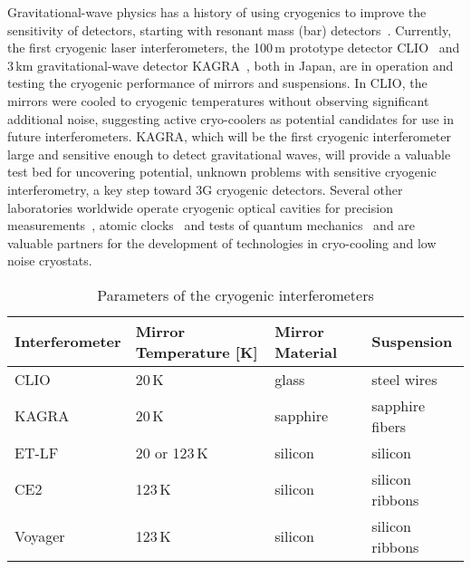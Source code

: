 Gravitational-wave physics has a history of using cryogenics to improve the sensitivity of detectors, starting with resonant mass (bar) detectors~\cite{ColdBars}. Currently, the first cryogenic laser interferometers, the 100\,m prototype detector CLIO~\cite{CLIO:2008} and 3\,km gravitational-wave detector KAGRA~\cite{KAGRA2013}, both in Japan, are in operation and testing the cryogenic performance of mirrors and suspensions. 
In CLIO, the mirrors were cooled to cryogenic temperatures without observing significant additional noise, suggesting active cryo-coolers as potential candidates for use in future interferometers. KAGRA, which will be the first cryogenic interferometer large and sensitive enough to detect gravitational waves, will provide a valuable test bed for uncovering potential, unknown problems with sensitive cryogenic interferometry, a key step toward 3G cryogenic detectors. Several other laboratories worldwide operate cryogenic optical cavities for precision measurements~\cite{Mueller:03}, atomic clocks~\cite{JunYeGroup:2019} and tests of quantum mechanics~\cite{CaltechIQIM} and are valuable partners for the development of technologies in cryo-cooling and low noise cryostats. 

\begin{table}[h]
\centering
\begin{tabular}{ |l||l|l|l|  }
 \hline
 Interferometer & Mirror Temperature [K] & Mirror Material & Suspension \\
 \hline
 CLIO           &   20\,K           & glass     &  steel wires \\
 KAGRA          &   20\,K           & sapphire  &  sapphire fibers  \\
 ET-LF             &   20 or 123\,K    & silicon   &  silicon  \\
 CE2             &   123\,K          & silicon   &  silicon ribbons \\
 Voyager        &   123\,K          & silicon   &  silicon ribbons \\
 \hline
\end{tabular}
\caption[Cryo IFOs]{Parameters of the cryogenic interferometers}
\label{tab:CryoTemps}
\end{table}

